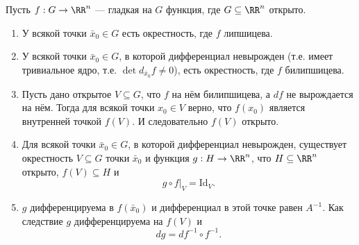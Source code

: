 \documentclass[12pt,a4paper]{article}
\newcommand{\Id}{\mathrm{Id}}
\begin{document}
    \begin{theorem}
        Пусть $f: G \to \RR^n$ --- гладкая на $G$ функция, где $G \subseteq \RR^n$ открыто. %
        \begin{enumerate}
            \item У всякой точки $\bar{x}_0 \in G$ есть окрестность, где $f$ липшицева.
            \item У всякой точки $\bar{x}_0 \in G$, в которой дифференциал невырожден (т.е. имеет тривиальное ядро, т.е. $\det d_{\bar{x}_0} f \neq 0$), есть окрестность, где $f$ билипшицева.
            \item Пусть дано открытое $V \subseteq G$, что $f$ на нём билипшицева, а $df$ не вырождается на нём. Тогда для всякой точки $x_0 \in V$ верно, что $f(x_0)$ является внутренней точкой $f(V)$. И следовательно $f(V)$ открыто.
            \item Для всякой точки $\bar{x}_0 \in G$, в которой дифференциал невырожден, существует окрестность $V \subseteq G$ точки $\bar{x}_0$ и функция $g: H \to \RR^n$, что $H \subseteq \RR^n$ открыто, $f(V) \subseteq H$ и
                \[g \circ f|_V = \Id_V.\]
            \item $g$ дифференцируема в $f(\bar{x}_0)$ и дифференциал в этой точке равен $A^{-1}$. Как следствие $g$ дифференцируема на $f(V)$ и
                \[dg = df^{-1} \circ f^{-1}.\]
        \end{enumerate}
    \end{theorem}


\end{document}
